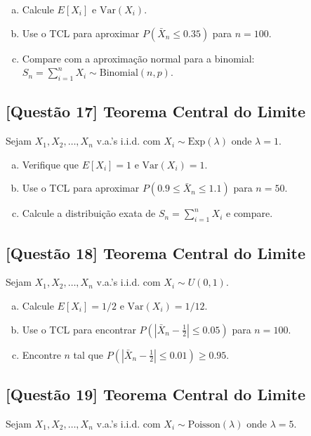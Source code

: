 \documentclass[12pt,a4paper]{article}
\begin{document}
\begin{enumerate}[(a)]
    \item Calcule $E[X_i]$ e $\text{Var}(X_i)$.
    \item Use o TCL para aproximar $P(\bar{X}_n \leq 0.35)$ para $n = 100$.
    \item Compare com a aproximação normal para a binomial: $S_n = \sum_{i=1}^n X_i \sim \text{Binomial}(n, p)$.
\end{enumerate}

\subsection*{[Questão 17] Teorema Central do Limite}

Sejam $X_1, X_2, \ldots, X_n$ v.a.'s i.i.d. com $X_i \sim \text{Exp}(\lambda)$ onde $\lambda = 1$.

\begin{enumerate}[(a)]
    \item Verifique que $E[X_i] = 1$ e $\text{Var}(X_i) = 1$.
    \item Use o TCL para aproximar $P(0.9 \leq \bar{X}_n \leq 1.1)$ para $n = 50$.
    \item Calcule a distribuição exata de $S_n = \sum_{i=1}^n X_i$ e compare.
\end{enumerate}

\subsection*{[Questão 18] Teorema Central do Limite}

Sejam $X_1, X_2, \ldots, X_n$ v.a.'s i.i.d. com $X_i \sim U(0, 1)$.

\begin{enumerate}[(a)]
    \item Calcule $E[X_i] = 1/2$ e $\text{Var}(X_i) = 1/12$.
    \item Use o TCL para encontrar $P\left(\left|\bar{X}_n - \frac{1}{2}\right| \leq 0.05\right)$ para $n = 100$.
    \item Encontre $n$ tal que $P\left(\left|\bar{X}_n - \frac{1}{2}\right| \leq 0.01\right) \geq 0.95$.
\end{enumerate}

\subsection*{[Questão 19] Teorema Central do Limite}

Sejam $X_1, X_2, \ldots, X_n$ v.a.'s i.i.d. com $X_i \sim \text{Poisson}(\lambda)$ onde $\lambda = 5$.
\end{document}
